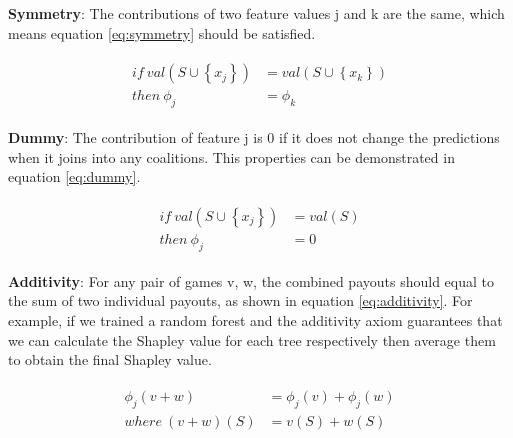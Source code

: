 \textbf{Symmetry}: The contributions of two feature values j and k are the same, which means equation \ref{eq:symmetry} should be satisfied. 

\begin{equation} \label{eq:symmetry}
\begin{gathered}
\begin{aligned}
if \ val\left(S \cup\left\{x_{j}\right\}\right) &= val\left(S \cup\left\{x_{k}\right\}\right) \\
then \  \phi_{j} &= \phi_{k}
\end{aligned}
\end{gathered}
\end{equation}

\textbf{Dummy}: The contribution of feature j is 0 if it does not change the predictions when it joins into any coalitions. This properties can be demonstrated in equation \ref{eq:dummy}.

\begin{equation} \label{eq:dummy}
\begin{gathered}
\begin{aligned}
if \ val\left(S \cup\left\{x_{j}\right\}\right) &= val\left(S \right) \\
then \  \phi_{j} &= 0
\end{aligned}
\end{gathered}
\end{equation}

\textbf{Additivity}: For any pair of games v, w, the combined payouts should equal to the sum of two individual payouts, as shown in equation \ref{eq:additivity}. For example, if we trained a random forest and the additivity axiom guarantees that we can calculate the Shapley value for each tree respectively then average them to obtain the final Shapley value. 

\begin{equation} \label{eq:additivity}
\begin{gathered}
\begin{aligned}
\phi_{j}(v+w) &= \phi_{j}(v) + \phi_{j}(w) \\
where \ (v+w)(S) &= v(S) + w(S)
\end{aligned}
\end{gathered}
\end{equation}

